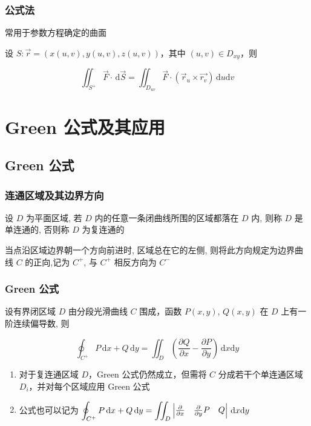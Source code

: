 \documentclass[lang = zh , final , oneside , openany , titlepage , zihao = -4 , linespread = 1.3 , baselineskip = false , cjk-font = windows , text-font = newtx , math-font = newtx , math-style = ISO , uppercase-greek = upright , integral-limits = false]{sjtureport}
\begin{document}
\subsubsection{公式法}

常用于参数方程确定的曲面

设 \(S:\vec{r} = \left(x(u,v),y(u,v),z(u,v)\right)\)，其中
\((u,v)\in D_{xy}\)，则

\[\iint_{S^+}\vec{F}\cdot\,\mathrm{d}\vec{S} = \iint_{D_{uv}}\vec{F}\cdot\left(\vec{r}_u\times\vec{r_v}\right)\,\mathrm{d}u\mathrm{d}v\]

\section{Green 公式及其应用}

\subsection{Green 公式}

\subsubsection{连通区域及其边界方向}

设 \(D\) 为平面区域, 若 \(D\) 内的任意一条闭曲线所围的区域都落在 \(D\)
内, 则称 \(D\) 是单连通的, 否则称 \(D\) 为复连通的

当点沿区域边界朝一个方向前进时, 区域总在它的左侧,
则将此方向规定为边界曲线 \(C\) 的正向,记为 \(C^+\), 与 \(C^+\)
相反方向为 \(C^-\)

\subsubsection{Green 公式}

\begin{theorem}
    设有界闭区域 \(D\) 由分段光滑曲线 \(C\) 围成，函数 \(P(x, y)\),
\(Q(x, y)\) 在 \(D\) 上有一阶连续偏导数, 则

\[\oint_{C^+} P\,\mathrm{d}x + Q\,\mathrm{d}y = \iint_D \left(\frac{\partial Q}{\partial x} - \frac{\partial P}{\partial y}\right)\,\mathrm{d}x\mathrm{d}y\]
\end{theorem}

\begin{enumerate}
\item
  对于复连通区域 \(D\)，Green 公式仍然成立，但需将 \(C\)
  分成若干个单连通区域 \(D_i\)，并对每个区域应用 Green 公式
\item
  公式也可以记为
  \(\displaystyle\oint_{C^+} P\,\mathrm{d}x + Q\,\mathrm{d}y = \iint_D \begin{vmatrix}\frac{\partial}{\partial x}&\frac{\partial}{\partial y}\newline P&Q\end{vmatrix}\,\mathrm{d}x\mathrm{d}y\)
\end{enumerate}
\end{document}
